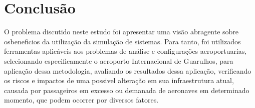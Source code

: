 \documentclass[12pt]{article}
\begin{document}
\section{Conclusão}

O problema discutido neste estudo foi apresentar uma visão abragente 
sobre osbeneficios da utilização da simulação de sistemas. Para tanto, foi 
utilizados ferramentas aplicáveis aos problemas de análise e configurações 
aeroportuarias, selecionando especificamente o aeroporto Internacional de
Guarulhos, para aplicação dessa metodologia, avaliando os resultados dessa
aplicação, verificando os riscos e impactos de uma possivel alteração em
sua infraestrutura atual, causada por passageiros em excesso ou demanada de 
aeronaves em determinado momento, que podem ocorrer por diversos fatores.




\end{document}
